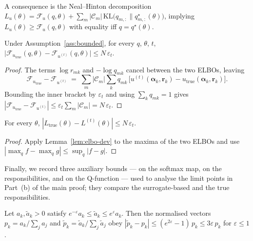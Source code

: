 A consequence is the Neal--Hinton decomposition
$L_u(\theta) = \mathcal{F}_u(q, \theta) + \sum_m |\mathcal{C}_m|\,
\mathrm{KL}\!\bigl(q_{m,:}\|q^{\star}_{m,:}(\theta)\bigr)$,
implying $L_u(\theta) \geq \mathcal{F}_u(q,\theta)$ with equality iff
$q = q^{\star}(\theta)$.

\begin{lemma}
\label{lem:elbo-dev}
Under Assumption~\ref{ass:bounded}, for every $q$, $\theta$, $t$,
$\bigl|\mathcal{F}_{u_{\mathrm{true}}}(q,\theta) -
\mathcal{F}_{u^{(t)}}(q,\theta)\bigr| \leq N\,\varepsilon_t$.
\end{lemma}

\begin{proof}
The terms $\log r_{mk}$ and $-\log q_{mk}$ cancel between the two
ELBOs, leaving
\begin{equation*}
\mathcal{F}_{u_{\mathrm{true}}} - \mathcal{F}_{u^{(t)}}
\;=\; \sum_m |\mathcal{C}_m| \sum_k q_{mk}\,
\bigl[u^{(t)}(\boldsymbol{\alpha}_k, \mathbf{r}_k) -
u_{\mathrm{true}}(\boldsymbol{\alpha}_k, \mathbf{r}_k)\bigr].
\end{equation*}
Bounding the inner bracket by $\varepsilon_t$ and using
$\sum_k q_{mk} = 1$ gives
$|\mathcal{F}_{u_{\mathrm{true}}} - \mathcal{F}_{u^{(t)}}|
\leq \varepsilon_t \sum_m |\mathcal{C}_m| = N\,\varepsilon_t$.
\end{proof}

\begin{corollary}
\label{cor:lik-dev}
For every $\theta$, $|L_{\mathrm{true}}(\theta) - L^{(t)}(\theta)|
\leq N\,\varepsilon_t$.
\end{corollary}

\begin{proof}
Apply Lemma~\ref{lem:elbo-dev} to the maxima of the two ELBOs and
use $|\max_q f - \max_q g| \leq \sup_q |f - g|$.
\end{proof}

Finally, we record three auxiliary bounds --- on the softmax map, on
the responsibilities, and on the Q-function --- used to analyse the
limit points in Part~(b) of the main proof; they compare the
surrogate-based and the true responsibilities.

\begin{lemma}
\label{lem:softmax}
Let $a_k, \tilde a_k > 0$ satisfy
$e^{-\varepsilon} a_k \leq \tilde a_k \leq e^{\varepsilon} a_k$. Then
the normalised vectors $p_k = a_k/\sum_j a_j$ and
$\tilde p_k = \tilde a_k/\sum_j \tilde a_j$ obey
$|\tilde p_k - p_k| \leq (e^{2\varepsilon} - 1)\,p_k \leq 3\varepsilon\,p_k$
for $\varepsilon \leq 1$.
\end{lemma}

